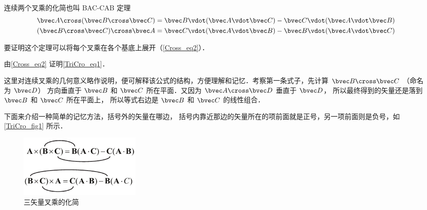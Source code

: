

连续两个叉乘的化简也叫 BAC-CAB 定理
\begin{gather}
\bvec A \cross (\bvec B \cross \bvec C) = \bvec B \vdot (\bvec A \vdot \bvec C) - \bvec C \vdot (\bvec A \vdot \bvec B)\label{TriCro_eq1}\\
(\bvec B \cross \bvec C) \cross \bvec A = \bvec C \vdot (\bvec A \vdot \bvec B) - \bvec B \vdot (\bvec A \vdot \bvec C)
\end{gather}

要证明这个定理可以将每个叉乘在各个基底上展开（\autoref{Cross_eq2}）．

\begin{exercise}{}
由\autoref{Cross_eq2} 证明\autoref{TriCro_eq1}．
\end{exercise} 

这里对连续叉乘的几何意义略作说明，便可解释该公式的结构，方便理解和记忆．考察第一条式子，先计算 $\bvec B \cross \bvec C$ （命名为 $\bvec D$） 方向垂直于 $\bvec B$ 和 $\bvec C$ 所在平面．又因为 $\bvec A \cross \bvec D$ 垂直于 $\bvec D$， 所以最终得到的矢量还是落到 $\bvec B$ 和 $\bvec C$ 所在平面上， 所以等式右边是 $\bvec B$ 和 $\bvec C$ 的线性组合．

下面来介绍一种简单的记忆方法，括号外的矢量在哪边， 括号内靠近那边的矢量所在的项前面就是正号，另一项前面则是负号，如\autoref{TriCro_fig1} 所示．

\begin{figure}[ht]
\centering
\includegraphics[width=6cm]{./figures/TriCro1.pdf}
\caption{三矢量叉乘的化简}\label{TriCro_fig1}
\end{figure}